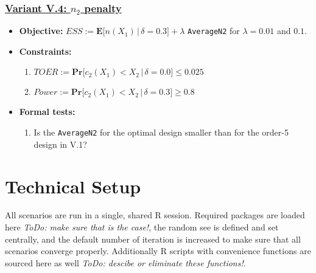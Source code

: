 \documentclass[]{book}
\providecommand{\tightlist}{%
  \setlength{\itemsep}{0pt}\setlength{\parskip}{0pt}}
\begin{document}
\hypertarget{variant-v.4-n_2-penalty}{%
\subsubsection{\texorpdfstring{\protect\hyperlink{variantV_4}{Variant V.4: \(n_2\) penalty}}{Variant V.4: n\_2 penalty}}\label{variant-v.4-n_2-penalty}}

\begin{itemize}
\tightlist
\item
  \textbf{Objective:} \(ESS := \boldsymbol{E}\big[n(X_1)\,|\,\delta=0.3\big] + \lambda\) \texttt{AverageN2}
  for \(\lambda = 0.01\) and \(0.1\).
\item
  \textbf{Constraints:}

  \begin{enumerate}
  \def\labelenumi{\arabic{enumi}.}
  \tightlist
  \item
    \(TOER := \boldsymbol{Pr}\big[c_2(X_1) < X_2\,|\,\delta=0.0\big] \leq 0.025\)
  \item
    \(Power := \boldsymbol{Pr}\big[c_2(X_1) < X_2\,|\,\delta=0.3\big] \geq 0.8\)
  \end{enumerate}
\item
  \textbf{Formal tests:}

  \begin{enumerate}
  \def\labelenumi{\arabic{enumi}.}
  \tightlist
  \item
    Is the \texttt{AverageN2} for the optimal design smaller than for the order-5
    design in V.1?
  \end{enumerate}
\end{itemize}

\hypertarget{technical-setup}{%
\section{Technical Setup}\label{technical-setup}}

All scenarios are run in a single, shared R session.
Required packages are loaded here \emph{ToDo: make sure that is the case!},
the random see is defined and set centrally, and the default number
of iteration is increased to make sure that all scenarios
converge properly.
Additionally R scripts with convenience functions are sourced here as well \emph{ToDo: descibe or eliminate these functions!}.
\end{document}
